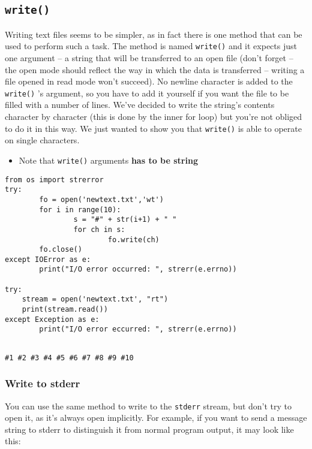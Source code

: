 \documentclass[11pt]{article}
\begin{document}
\vspace{10 mm}

\subsection{\texttt{write()}}
\label{sec:org5db876f}
Writing text files seems to be simpler, as in fact there is one method
that can be used to perform such a task.  The method is named
\texttt{write()} and it expects just one argument – a string that will be
transferred to an open file (don’t forget – the open mode should
reflect the way in which the data is transferred – writing a file
opened in read mode won’t succeed).  No newline character is added to
the \texttt{write()} ’s argument, so you have to add it yourself if you want
the file to be filled with a number of lines. We’ve decided to write
the string’s contents character by character (this is done by the
inner for loop) but you’re not obliged to do it in this way. We just
wanted to show you that \texttt{write()} is able to operate on single
characters.

\begin{itemize}
\item Note that \texttt{write()} arguments \textbf{has to be string}
\end{itemize}

\begin{verbatim}
from os import strerror
try:
        fo = open('newtext.txt','wt')
        for i in range(10):
                s = "#" + str(i+1) + " "
                for ch in s:
                        fo.write(ch)
        fo.close()
except IOError as e:
        print("I/O error occurred: ", strerr(e.errno))

try:
    stream = open('newtext.txt', "rt")
    print(stream.read())
except Exception as e:
        print("I/O error eccurred: ", strerr(e.errno))


\end{verbatim}

\begin{verbatim}
#1 #2 #3 #4 #5 #6 #7 #8 #9 #10 
\end{verbatim}

\subsubsection{Write to stderr}
\label{sec:org0854497}
You can use the same method to write to the \texttt{stderr} stream, but
don’t try to open it, as it’s always open implicitly. For example, if
you want to send a message string to stderr to distinguish it from
normal program output, it may look like this:
\end{document}
